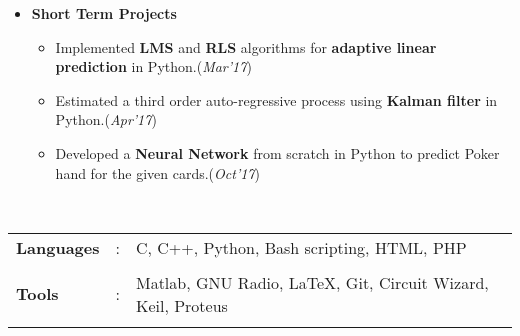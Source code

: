 \documentclass[10pt]{article}
\newcommand\hs{1.3mm}		%
\begin{document}
\begin{itemize}[leftmargin=0.4cm]
\item \textbf{Short Term Projects}\vspace{-0.22cm}
	\begin{itemize}
	\item Implemented \textbf{LMS} and \textbf{RLS} algorithms for \textbf{adaptive linear prediction} in Python.\hfill{(\textit{Mar'17})}\vspace{-0.1cm}
	\item Estimated a third order auto-regressive process using \textbf{Kalman filter} in Python.\hfill{(\textit{Apr'17})}\vspace{-0.1cm}
	\item Developed a \textbf{Neural Network} from scratch in Python to predict Poker hand for the given cards.\hfill{(\textit{Oct'17})}\vspace{-0.05cm}
	\end{itemize}


\begin{comment}

\item \textbf{Space-Time Codes for Wireless Communications  \textbf{[Seminar]}
}\hfill{\textit{(Jul'17 - Nov'17)}}\\
Guide: \textit{Prof. Bikas Kumar Dey, Electrical Engineering, IIT Bombay}\\\vspace{-0.7cm}
	\begin{itemize}
	\item Studied  the classical MMRC and the \textbf{Alamouti} transmit diversity techniques and their performance.\vspace{-0.1cm}
	\item Studied \textbf{design criteria} for Space-Time Codes and orthogonal designs.
	\end{itemize}
	
	\vspace{-0.2cm}
\end{comment}

\end{itemize}

\colorbox{bl}{}\\
\begin{tabular}{m{1in}m{0.20in}m{4.5in}}
	\\[-3mm]
	\hspace{\hs} \hspace{0.12cm}\textbf{\textbf{Languages}} &: & {{C, C++, Python, Bash scripting, HTML, PHP}} \\
	\\[-3.5mm]
	\hspace{\hs} \hspace{0.12cm}\textbf{\textbf{Tools}} &: & {Matlab, GNU Radio, \LaTeX, Git, Circuit Wizard, Keil, Proteus}\\
	\\[-4mm]
\end{tabular}\\
\end{document}
